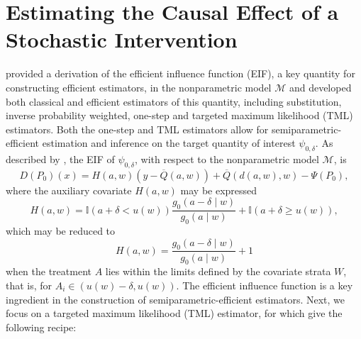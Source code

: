 \documentclass[
  12pt, krantz2,
]{krantz}
\newcommand{\M}{\mathcal{M}}
\newcommand{\1}{\mathbbm{1}}
\theoremstyle{definition}
\theoremstyle{definition}
\theoremstyle{definition}
\theoremstyle{definition}
\theoremstyle{remark}
\begin{document}
\hypertarget{estimating-the-causal-effect-of-a-stochastic-intervention}{%
\section{Estimating the Causal Effect of a Stochastic Intervention}\label{estimating-the-causal-effect-of-a-stochastic-intervention}}

\citet{diaz2012population} provided a derivation of the efficient influence function
(EIF), a key quantity for constructing efficient estimators, in the
nonparametric model \(\M\) and developed both classical and efficient estimators
of this quantity, including substitution, inverse probability weighted, one-step
and targeted maximum likelihood (TML) estimators. Both the one-step and TML
estimators allow for semiparametric-efficient estimation and inference on the
target quantity of interest \(\psi_{0, \delta}\). As described by
\citet{diaz2018stochastic}, the EIF of \(\psi_{0, \delta}\), with respect to the
nonparametric model \(\M\), is
\begin{equation}
  D(P_0)(x) = H(a, w)({y - \overline{Q}(a, w)}) +
  \overline{Q}(d(a, w), w) - \Psi(P_0),
  \label{eq:eif-shift}
\end{equation}
where the auxiliary covariate \(H(a,w)\) may be expressed
\begin{equation}
  H(a,w) = \mathbb{I}(a + \delta < u(w)) \frac{g_0(a - \delta \mid w)}
  {g_0(a \mid w)} + \mathbb{I}(a + \delta \geq u(w)),
  \label{eq:aux-covar-full-shift}
\end{equation}
which may be reduced to
\begin{equation}
  H(a,w) = \frac{g_0(a - \delta \mid w)}{g_0(a \mid w)} + 1
  \label{eq:aux-covar-simple-shift}
\end{equation}
when the treatment \(A\) lies within the limits defined by the covariate strata
\(W\), that is, for \(A_i \in (u(w) - \delta, u(w))\). The efficient influence
function is a key ingredient in the construction of semiparametric-efficient
estimators. Next, we focus on a targeted maximum likelihood (TML) estimator, for
which \citet{diaz2018stochastic} give the following recipe:
\end{document}
